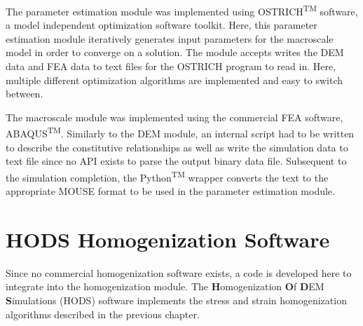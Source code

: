 The parameter estimation module was implemented using OSTRICH\textsuperscript{TM} software, a model independent optimization software toolkit. Here, this parameter estimation module iteratively generates input parameters for the macroscale model in order to converge on a solution. The module accepts writes the DEM data and FEA data to text files for the OSTRICH program to read in. Here, multiple different optimization algorithms are implemented and easy to switch between.

The macroscale module was implemented using the commercial FEA software, ABAQUS\textsuperscript{TM}. Similarly to the DEM module, an internal script had to be written to describe the constitutive relationships as well as write the simulation data to text file since no API exists to parse the output binary data file. Subsequent to the simulation completion, the Python\textsuperscript{TM} wrapper converts the text to the appropriate MOUSE format to be used in the parameter estimation module.


\section{HODS Homogenization Software}

Since no commercial homogenization software exists, a code is developed here to integrate into the homogenization module. The \textbf{H}omogenization \textbf{O}f \textbf{D}EM \textbf{S}imulations (HODS) software implements the stress and strain homogenization algorithms described in the previous chapter. 

